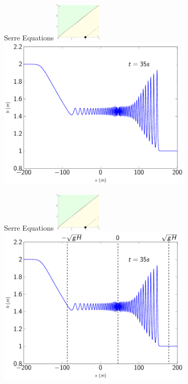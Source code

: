 \documentclass[pdf]{beamer}
\begin{document}
\begin{frame}{Serre Equations \hfill \includegraphics[width=0.17\textwidth]{./Pics/Tex/Explanatory/RegionsPlot/SPSerre.pdf}}
\centering
\includegraphics[width=0.7\textwidth]{./Pics/Tex/Results/DB/Serre/Serre.pdf}
\end{frame}

\begin{frame}{Serre Equations \hfill \includegraphics[width=0.17\textwidth]{./Pics/Tex/Explanatory/RegionsPlot/SPSerre.pdf}}
\centering
\includegraphics[width=0.7\textwidth]{./Pics/Tex/Results/DB/Serre/RegionSerre.pdf}
\end{frame}
\end{document}
